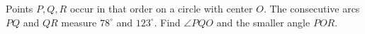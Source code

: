 Points $P,Q,R$ occur in that order on a circle with center $O$. The consecutive arcs $PQ$ and $QR$ measure $78^\circ$ and $123^\circ$. Find $\angle PQO$ and the smaller angle $POR$.
